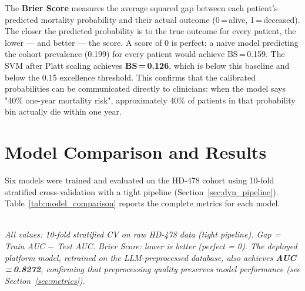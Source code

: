 \documentclass[12pt,a4paper,twoside]{report}
\begin{document}
The \textbf{Brier Score} \cite{brier_1950} measures the average squared gap between each patient's predicted mortality probability and their actual outcome (0\,=\,alive, 1\,=\,deceased). The closer the predicted probability is to the true outcome for every patient, the lower — and better — the score. A score of 0 is perfect; a naive model predicting the cohort prevalence (0.199) for every patient would achieve BS\,=\,0.159. The SVM after Platt scaling achieves \textbf{BS\,=\,0.126}, which is below this baseline and below the 0.15 excellence threshold. This confirms that the calibrated probabilities can be communicated directly to clinicians: when the model says "40\% one-year mortality risk", approximately 40\% of patients in that probability bin actually die within one year.

\section{Model Comparison and Results}\label{sec:results}

Six models were trained and evaluated on the HD-478 cohort using 10-fold stratified cross-validation with a tight pipeline (Section~\ref{sec:dyn_pipeline}). Table~\ref{tab:model_comparison} reports the complete metrics for each model.

\begin{table}[htbp]
\centering
\caption{Comparison of all six ML models --- HD-478 cohort, tight pipeline, 10-fold CV}
\label{tab:model_comparison}
\smallskip\\
\footnotesize\textit{All values: 10-fold stratified CV on raw HD-478 data (tight pipeline). Gap = Train AUC $-$ Test AUC. Brier Score: lower is better (perfect = 0). The deployed platform model, retrained on the LLM-preprocessed database, also achieves \textbf{AUC\,=\,0.8272}, confirming that preprocessing quality preserves model performance (see Section~\ref{sec:metrics}).}
\end{table}
\end{document}

